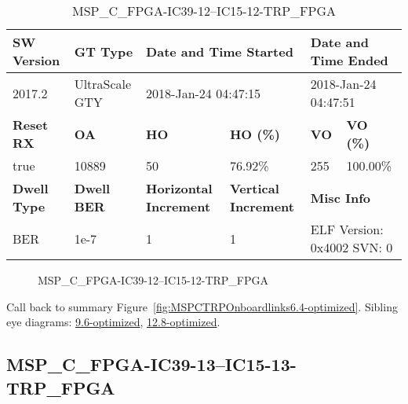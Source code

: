 \begin{table}[h]
\centering
\caption{MSP\_C\_FPGA-IC39-12--IC15-12-TRP\_FPGA}
\label{tab:MSPCFPGAIC3912IC1512TRPFPGA6.4-optimized}
\begin{tabular}{@{}|l|l|l|l|l|l|@{}}
\toprule
\textbf{SW Version}                & \textbf{GT Type}   & \multicolumn{2}{l|}{\textbf{Date and Time Started}}            & \multicolumn{2}{l|}{\textbf{Date and Time Ended}}        \\ \midrule
2017.2                       & UltraScale GTY          & \multicolumn{2}{l|}{2018-Jan-24 04:47:15}                   & \multicolumn{2}{l|}{2018-Jan-24 04:47:51}               \\ \midrule
\textbf{Reset RX}                  & \textbf{OA} & \textbf{HO}   & \textbf{HO (\%)} & \textbf{VO} & \textbf{VO (\%)} \\ \midrule
true & 10889        & 50          & 76.92\%        & 255        & 100.00\%       \\ \midrule
\textbf{Dwell Type}                & \textbf{Dwell BER} & \textbf{Horizontal Increment} & \textbf{Vertical Increment}    & \multicolumn{2}{l|}{\textbf{Misc Info}}                  \\ \midrule
BER                            & 1e-7        & 1        & 1           & \multicolumn{2}{l|}{ELF Version: 0x4002 SVN: 0}                         \\ \bottomrule
\end{tabular}
\end{table}

\begin{figure}[h]
\caption{MSP\_C\_FPGA-IC39-12--IC15-12-TRP\_FPGA} \label{fig:MSPCFPGAIC3912IC1512TRPFPGA6.4-optimized}
\end{figure}

Call back to summary Figure~\ref{fig:MSPCTRPOnboardlinks6.4-optimized}.
Sibling eye diagrams: \hyperref[sec:MSPCFPGAIC3912IC1512TRPFPGA9.6-optimized]{9.6-optimized}, \hyperref[sec:MSPCFPGAIC3912IC1512TRPFPGA12.8-optimized]{12.8-optimized}.

\clearpage
\newpage


\subsection{MSP\_C\_FPGA-IC39-13--IC15-13-TRP\_FPGA}\label{sec:MSPCFPGAIC3913IC1513TRPFPGA6.4-optimized}

